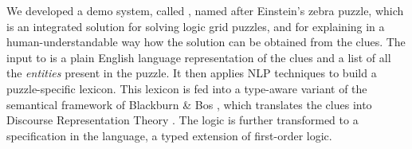 
We developed a demo system, called \ourtool, named after Einstein's zebra puzzle, which is an integrated solution for solving logic grid puzzles, and for explaining in a human-understandable way how the solution can be obtained from the clues. 
The input to \ourtool is a plain English language representation of the clues and a list of all the \textit{entities} present in the puzzle. It then applies NLP techniques to build a puzzle-specific lexicon. This lexicon is fed into a type-aware variant of the semantical framework of Blackburn \& Bos \cite{Blackburn2005,Blackburn2006}, which translates the clues into Discourse Representation Theory \cite{DRT}. The logic is further transformed to a specification in the \idp language, a typed extension of first-order logic. 

